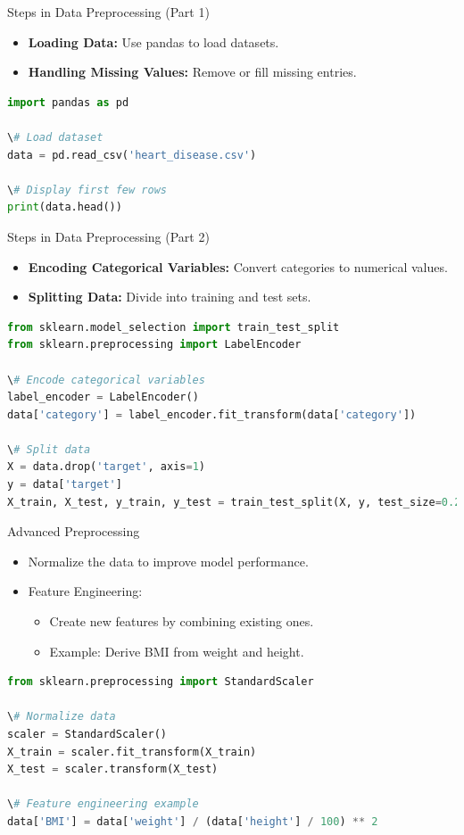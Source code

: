 \documentclass{beamer}
\begin{document}
\begin{frame}{Steps in Data Preprocessing (Part 1)}
\begin{itemize}
    \item \textbf{Loading Data:} Use pandas to load datasets.
    \item \textbf{Handling Missing Values:} Remove or fill missing entries.
\end{itemize}
\begin{lstlisting}[language=Python, caption=Loading Data with Pandas]
import pandas as pd

\# Load dataset
data = pd.read_csv('heart_disease.csv')

\# Display first few rows
print(data.head())
\end{lstlisting}
\end{frame}

\begin{frame}{Steps in Data Preprocessing (Part 2)}
\begin{itemize}
    \item \textbf{Encoding Categorical Variables:} Convert categories to numerical values.
    \item \textbf{Splitting Data:} Divide into training and test sets.
\end{itemize}
\begin{lstlisting}[language=Python, caption=Encoding and Splitting Data]
from sklearn.model_selection import train_test_split
from sklearn.preprocessing import LabelEncoder

\# Encode categorical variables
label_encoder = LabelEncoder()
data['category'] = label_encoder.fit_transform(data['category'])

\# Split data
X = data.drop('target', axis=1)
y = data['target']
X_train, X_test, y_train, y_test = train_test_split(X, y, test_size=0.2, random_state=42)
\end{lstlisting}
\end{frame}

\begin{frame}{Advanced Preprocessing}
\begin{itemize}
    \item Normalize the data to improve model performance.
    \item Feature Engineering:
    \begin{itemize}
        \item Create new features by combining existing ones.
        \item Example: Derive BMI from weight and height.
    \end{itemize}
\end{itemize}
\begin{lstlisting}[language=Python, caption=Normalization and Feature Engineering]
from sklearn.preprocessing import StandardScaler

\# Normalize data
scaler = StandardScaler()
X_train = scaler.fit_transform(X_train)
X_test = scaler.transform(X_test)

\# Feature engineering example
data['BMI'] = data['weight'] / (data['height'] / 100) ** 2
\end{lstlisting}
\end{frame}
\end{document}
